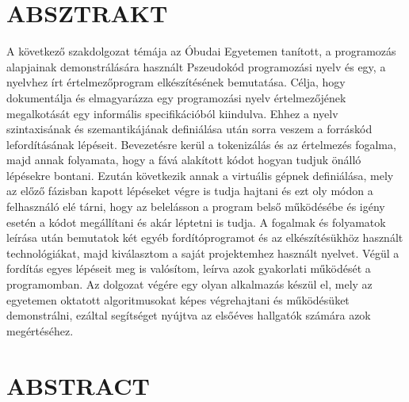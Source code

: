 \documentclass[12pt,a4paper]{article}
\begin{document}


% 

% 



\clearpage
\section{ABSZTRAKT}

A következő szakdolgozat témája az Óbudai Egyetemen tanított, a programozás alapjainak demonstrálására használt Pszeudokód programozási nyelv és egy, a nyelvhez írt értelmezőprogram elkészítésének bemutatása. Célja, hogy dokumentálja és elmagyarázza egy programozási nyelv értelmezőjének megalkotását egy informális specifikációból kiindulva. Ehhez a nyelv szintaxisának és szemantikájának definiálása után sorra veszem a forráskód lefordításának lépéseit. Bevezetésre kerül a tokenizálás és az értelmezés fogalma, majd annak folyamata, hogy a fává alakított kódot hogyan tudjuk önálló lépésekre bontani. Ezután következik annak a virtuális gépnek definiálása, mely az előző fázisban kapott lépéseket végre is tudja hajtani és ezt oly módon a felhasználó elé tárni, hogy az belelásson a program belső működésébe és igény esetén a kódot megállítani és akár léptetni is tudja. A fogalmak és folyamatok leírása után bemutatok két egyéb fordítóprogramot és az elkészítésükhöz használt technológiákat, majd kiválasztom a saját projektemhez használt nyelvet. Végül a fordítás egyes lépéseit meg is valósítom, leírva azok gyakorlati működését a programomban. Az dolgozat végére egy olyan alkalmazás készül el, mely az egyetemen oktatott algoritmusokat képes végrehajtani és működésüket demonstrálni, ezáltal segítséget nyújtva az elsőéves hallgatók számára azok megértéséhez.

\clearpage
\section{ABSTRACT}
\end{document}
